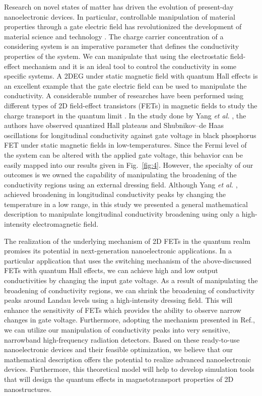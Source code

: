 \documentclass[
 reprint,
 amsmath,amssymb,
 aps,
 prb,
]{revtex4-2}
\begin{document}
{Research on novel states of matter has driven the evolution of present-day nanoelectronic devices. In particular, controllable manipulation of material properties through a gate electric field has revolutionized the development of material science and technology \cite{ahn03,deng18}.
The charge carrier concentration of a considering system is an imperative parameter that defines the conductivity properties of the system. We can manipulate that using the electrostatic field-effect mechanism and it is an ideal tool to control the conductivity in some specific systems.
A 2DEG under static magnetic field with quantum Hall effects is an excellent example that the gate electric field can be used to manipulate the conductivity. A considerable number of researches have been performed using different types of 2D field-effect transistors (FETs) in magnetic fields to study the charge transport in the quantum limit \cite{wakabayashi78,yang18,long20,li14}. In the study done by Yang \textit{et al.} \cite{yang18}, the authors have observed quantized Hall plateaus and Shubnikov–de Haas oscillations for longitudinal conductivity against gate voltage in black phosphorus FET under static magnetic fields in low-temperatures. Since the Fermi level of the system can be altered with the applied gate voltage, this behavior can be easily mapped into our results given in Fig.~\ref{fig:4}. However, the specialty of our outcomes is we owned the capability of manipulating the broadening of the conductivity regions using an external dressing field. Although Yang \textit{et al.} \cite{yang18}, achieved broadening in longitudinal conductivity peaks by changing the temperature in a low range, in this study we presented a general mathematical description to manipulate longitudinal conductivity broadening using only a high-intensity electromagnetic field.

The realization of the underlying mechanism of 2D FETs in the quantum realm promises its potential in next-generation nanoelectronic applications. In a particular application that uses the switching mechanism of the above-discussed FETs with quantum Hall effects, we can achieve high and low output conductivities by changing the input gate voltage. As a result of manipulating the broadening of conductivity regions, we can shrink the broadening of conductivity peaks around Landau levels using a high-intensity dressing field. This will enhance the sensitivity of FETs which provides the ability to observe narrow changes in gate voltage.
Furthermore, adopting the mechanism presented in Ref.\cite{hirakawa01}, we can utilize our manipulation of conductivity peaks into very sensitive, narrowband high-frequency radiation detectors.
Based on these ready-to-use nanoelectronic devices and their feasible optimization, we believe that our mathematical description offers the potential to realize advanced nanoelectronic devices. Furthermore, this theoretical model will help to develop simulation tools that will design the quantum effects in magnetotransport properties of 2D nanostructures.
}
\end{document}
